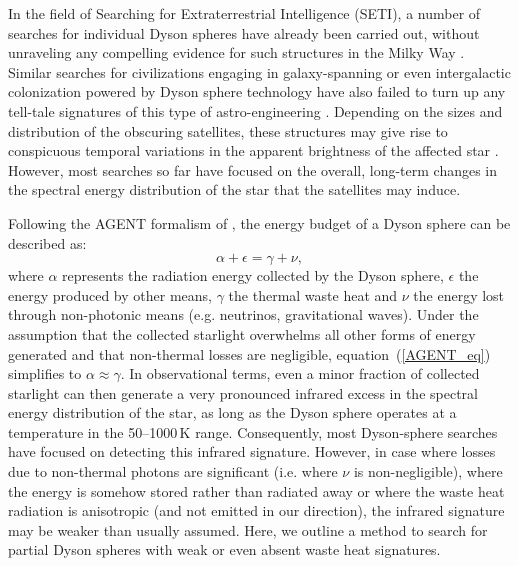\documentclass[twocolumn]{aastex6}
\begin{document}
In the field of Searching for Extraterrestrial Intelligence (SETI), a number of searches for individual Dyson spheres have already been carried out, without unraveling any compelling evidence for such structures in the Milky Way \citep{Slysh85,Timofeev00,Jugaku04,Carrigan09}. Similar searches for civilizations engaging in galaxy-spanning or even intergalactic colonization powered by Dyson sphere technology have also failed to turn up any tell-tale signatures of this type of astro-engineering \citep{Annis99,Wright14a,Wright14b,Griffith15,Zackrisson15,Garrett15,Olson17}. Depending on the sizes and distribution of the obscuring satellites, these structures may give rise to conspicuous temporal variations in the apparent brightness of the affected star \citep[e.g.][]{Arnold05,Wright16,Osmanov16}. However, most searches so far have focused on the overall, long-term changes in the spectral energy distribution of the star that the satellites may induce.

Following the AGENT formalism of \citet{Wright14b}, the energy budget of a Dyson sphere can be described as:
\begin{equation}
\alpha + \epsilon = \gamma + \nu,
\label{AGENT_eq}
\end{equation}
where $\alpha$ represents the radiation energy collected by the Dyson sphere, $\epsilon$ the energy produced by other means, $\gamma$ the thermal waste heat and $\nu$ the energy lost through non-photonic means (e.g. neutrinos, gravitational waves). Under the assumption that the collected starlight overwhelms all other forms of energy generated and that non-thermal losses are negligible, equation~(\ref{AGENT_eq}) simplifies to $\alpha \approx \gamma$. In observational terms, even a minor fraction of collected starlight can then generate a very pronounced infrared excess in the spectral energy distribution of the star, as long as the Dyson sphere operates at a temperature in the 50--1000\,K range. Consequently, most Dyson-sphere searches have focused on detecting this infrared signature. However, in case where losses due to non-thermal photons are significant (i.e. where $\nu$ is non-negligible), where the energy is somehow stored rather than radiated away or where the waste heat radiation is anisotropic (and not emitted in our direction), the infrared signature may be weaker than usually assumed. Here, we outline a method to search for partial Dyson spheres with weak or even absent waste heat signatures.  
\end{document}
